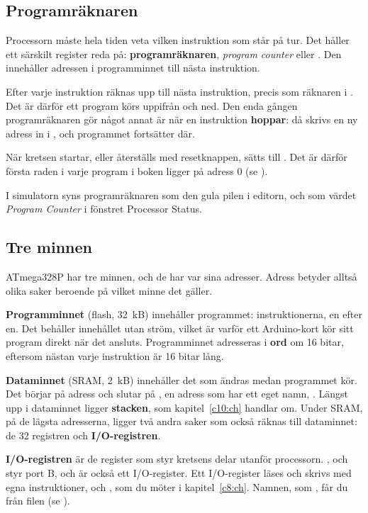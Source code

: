 \subsection{Programräknaren}
\label{c7:a4}
Processorn måste hela tiden veta vilken instruktion som står på tur. Det håller ett särskilt
register reda på: \textbf{programräknaren}, \emph{program counter} eller . Den innehåller
adressen i programminnet till nästa instruktion.

Efter varje instruktion räknas  upp till nästa instruktion, precis som räknaren i
. Det är därför ett program körs uppifrån och ned. Den enda gången programräknaren
gör något annat är när en instruktion \textbf{hoppar}: då skrivs en ny adress in i , och
programmet fortsätter där.

När kretsen startar, eller återställs med resetknappen, sätts  till . Det är
därför första raden i varje program i boken ligger på adress 0 (se ).

I simulatorn syns programräknaren som den gula pilen i editorn, och som värdet \emph{Program
Counter} i fönstret Processor Status.

\subsection{Tre minnen}
\label{c7:a5}
ATmega328P har tre minnen, och de har var sina adresser. Adress  betyder alltså olika
saker beroende på vilket minne det gäller.


\textbf{Programminnet} (flash, 32~kB) innehåller programmet: instruktionerna, en efter en. Det
behåller innehållet utan ström, vilket är varför ett Arduino-kort kör sitt program direkt när det
ansluts. Programminnet adresseras i \textbf{ord} om 16 bitar, eftersom nästan varje instruktion är
16 bitar lång.

\textbf{Dataminnet} (SRAM, 2~kB) innehåller det som ändras medan programmet kör. Det börjar på
adress  och slutar på , en adress som har ett eget namn, .
Längst upp i dataminnet ligger \textbf{stacken}, som kapitel~\ref{c10:ch} handlar om. Under SRAM,
på de lägsta adresserna, ligger två andra saker som också räknas till dataminnet: de 32 registren
och \textbf{I/O-registren}.

\textbf{I/O-registren} är de register som styr kretsens delar utanför processorn. ,
 och  styr port B, och  är också ett I/O-register. Ett
I/O-register läses och skrivs med egna instruktioner,  och , som du möter i
kapitel~\ref{c8:ch}. Namnen, som , får du från filen  (se
).

